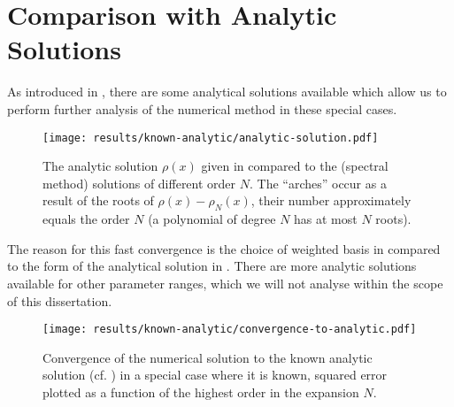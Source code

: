 \section{Comparison with Analytic Solutions}
As introduced in , there are some analytical solutions available which allow us to perform further analysis of the numerical method in these special cases.

\begin{figure}[H]
  \centering
  \texttt{[image: results/known-analytic/analytic-solution.pdf]}
  \caption[Comparison with analytical solutions and error]{
    The analytic solution $\rho(x)$ given in  compared to the (spectral method) solutions of different order $N$.
    The ``arches'' occur as a result of the roots of $\rho(x) - \rho_N(x)$, their number approximately equals the order $N$ (a polynomial of degree $N$ has at most $N$ roots).
  }
  \label{fig:analytic-solution}
\end{figure}

The reason for this fast convergence is the choice of weighted basis in  compared to the form of the analytical solution in .
There are more analytic solutions available for other parameter ranges, which we will not analyse within the scope of this dissertation.



\begin{figure}[H]
  \centering
  \texttt{[image: results/known-analytic/convergence-to-analytic.pdf]}
  \caption[Convergence to analytic solution]{Convergence of the numerical solution to the known analytic solution (cf. ) in a special case where it is known, squared error plotted as a function of the highest order in the expansion $N$.}
  \label{fig:convergence-to-analytic}
\end{figure}
